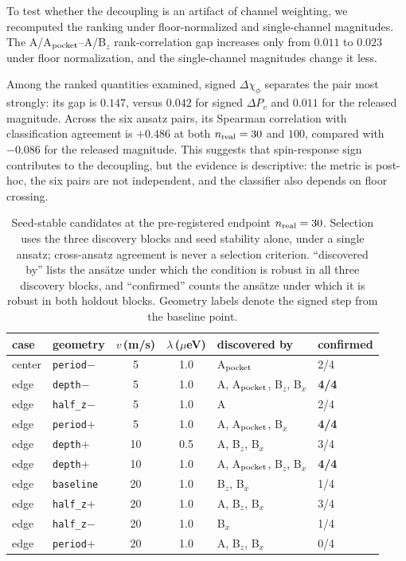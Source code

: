 \documentclass[aip,jap,reprint,superscriptaddress,longbibliography,floatfix]{revtex4-2}
\begin{document}
To test whether the decoupling is an artifact of channel weighting, we
recomputed the ranking under floor-normalized and single-channel magnitudes.
The A/A$_{\rm pocket}$--A/B$_z$ rank-correlation gap increases only from
$0.011$ to $0.023$ under floor normalization, and the single-channel
magnitudes change it less.

Among the ranked quantities examined, signed
$\Delta\chi_\phi$ separates the pair most strongly: its gap is $0.147$, versus
$0.042$ for signed $\Delta P_v$ and $0.011$ for the released magnitude. Across
the six ansatz pairs, its Spearman correlation with classification agreement is
$+0.486$ at both $n_{\rm real}=30$ and $100$, compared with $-0.086$ for the
released magnitude. This suggests that spin-response sign contributes to the
decoupling, but the evidence is descriptive: the metric is post-hoc, the six
pairs are not independent, and the classifier also depends on floor crossing.

\begin{table}[!tbp]
\centering
\caption{Seed-stable candidates at the pre-registered endpoint
$n_{\rm real}=30$. Selection uses the three discovery blocks and seed stability
alone, under a single ansatz; cross-ansatz agreement is never a selection
criterion. ``discovered by'' lists the ans\"atze under which the condition is
robust in all three discovery blocks, and ``confirmed'' counts the ans\"atze
under which it is robust in both holdout blocks. Geometry labels denote the
signed step from the baseline point.}
\label{tab:retest}
\small
\begin{tabular}{llccll}
\toprule
case & geometry & $v$\,(m/s) & $\lambda$\,($\mu$eV) & discovered by & confirmed \\
\midrule
center & \texttt{period}$-$   & 5  & 1.0 & A$_{\rm pocket}$                 & 2/4 \\
edge   & \texttt{depth}$-$    & 5  & 1.0 & A, A$_{\rm pocket}$, B$_z$, B$_x$& \textbf{4/4} \\
edge   & \texttt{half\_z}$-$  & 5  & 1.0 & A                           & 2/4 \\
edge   & \texttt{period}$+$   & 5  & 1.0 & A, A$_{\rm pocket}$, B$_x$       & \textbf{4/4} \\
edge   & \texttt{depth}$+$    & 10 & 0.5 & A, B$_z$, B$_x$             & 3/4 \\
edge   & \texttt{depth}$+$    & 10 & 1.0 & A, A$_{\rm pocket}$, B$_z$, B$_x$& \textbf{4/4} \\
edge   & \texttt{baseline}    & 20 & 1.0 & B$_z$, B$_x$                & 1/4 \\
edge   & \texttt{half\_z}$+$  & 20 & 1.0 & A, B$_z$, B$_x$             & 3/4 \\
edge   & \texttt{half\_z}$-$  & 20 & 1.0 & B$_x$                       & 1/4 \\
edge   & \texttt{period}$+$   & 20 & 1.0 & A, B$_z$, B$_x$             & 0/4 \\
\bottomrule
\end{tabular}
\end{table}
\end{document}
